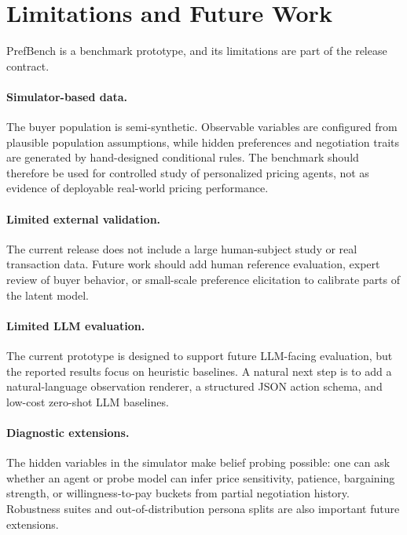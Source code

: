 \section{Limitations and Future Work}
\label{sec:limitations}

PrefBench is a benchmark prototype, and its limitations are part of the release contract.

\paragraph{Simulator-based data.}
The buyer population is semi-synthetic. Observable variables are configured from plausible population assumptions, while hidden preferences and negotiation traits are generated by hand-designed conditional rules. The benchmark should therefore be used for controlled study of personalized pricing agents, not as evidence of deployable real-world pricing performance.

\paragraph{Limited external validation.}
The current release does not include a large human-subject study or real transaction data. Future work should add human reference evaluation, expert review of buyer behavior, or small-scale preference elicitation to calibrate parts of the latent model.

\paragraph{Limited LLM evaluation.}
The current prototype is designed to support future LLM-facing evaluation, but the reported results focus on heuristic baselines. A natural next step is to add a natural-language observation renderer, a structured JSON action schema, and low-cost zero-shot LLM baselines.

\paragraph{Diagnostic extensions.}
The hidden variables in the simulator make belief probing possible: one can ask whether an agent or probe model can infer price sensitivity, patience, bargaining strength, or willingness-to-pay buckets from partial negotiation history. Robustness suites and out-of-distribution persona splits are also important future extensions.
